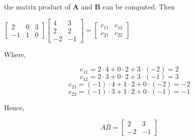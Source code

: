 \documentclass{report}
\begin{document}
the matrix product of $\mathbf{A}$ and $\mathbf{B}$ can be computed. Then
\bigbreak \noindent
\begin{center}
$\left[\begin{array}{rrr}
2 & 0 & 3 \\
-1 & 1 & 0
\end{array}\right]\left[\begin{array}{rr}
4 & 3 \\
2 & 2 \\
-2 & -1
\end{array}\right]=\left[\begin{array}{ll}
c_{11} & c_{12} \\
c_{21} & c_{22}
\end{array}\right]$
\end{center}

Where,

$$c_{11} = 2 \cdot 4 + 0 \cdot 2 + 3 \cdot (-2) = 2$$
$$
c_{12} = 2 \cdot 3+0 \cdot 2+3 \cdot(-1)=3
$$
$$
c_{21} = (-1) \cdot 4 + 1 \cdot 2 + 0 \cdot (-2) = -2
$$
$$
c_{22} = (-1) \cdot 3 + 1 \cdot 2 + 0 \cdot (-1) = -1
$$

Hence,

\[
AB =
\begin{bmatrix}
	2 & 3 \\
	-2 & -1
\end{bmatrix}
\]
\pagebreak
{}
\end{document}
